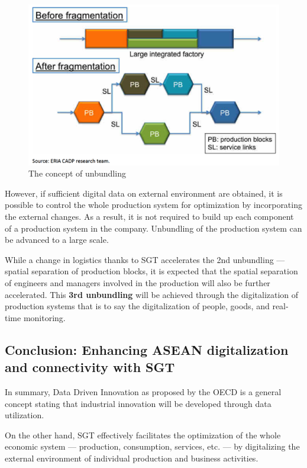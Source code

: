 \begin{figure}[H]
\begin{center}
\includegraphics[width = 0.8\linewidth]{Figures/unbundling.png}
\end{center}
\caption{The concept of unbundling}
\label{unbundling}
\end{figure}

However, if sufficient digital data on external environment are obtained, it is possible to control the whole production system for optimization by incorporating the external changes. As a result, it is not required to build up each component of a production system in the company. Unbundling of the production system can be advanced to a large scale.

\vspace{0.4 cm}

While a change in logistics thanks to SGT accelerates the 2nd unbundling --- spatial separation of production blocks, it is expected that the spatial separation of engineers and managers involved in the production will also be further accelerated. This \textbf{3rd unbundling} will be achieved through the digitalization of production systems that is to say the digitalization of people, goods, and real-time monitoring.


\subsection{Conclusion: Enhancing ASEAN digitalization and connectivity with SGT}

In summary, Data Driven Innovation as proposed by the OECD is a general concept stating that industrial innovation will be developed through data utilization.

On the other hand, SGT effectively facilitates the optimization of the whole economic system --- production, consumption, services, etc. --- by digitalizing the external environment of individual production and business activities. 

